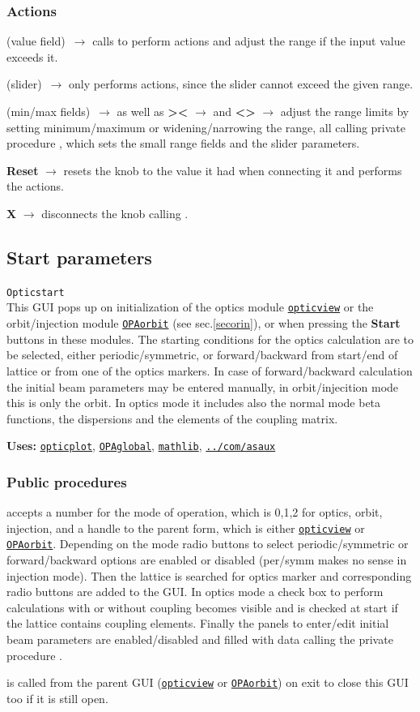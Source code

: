 \documentclass[12pt]{article}
\newcommand\code[1]{{\tt #1}}
\newcommand{\ofld}[1]{\colorbox{black!15}{{\bf #1}}}
\newcommand{\ofldx}[1]{\colorbox{black!15}{(#1)}}
\newcommand\guico[1]{{\color{blue}\code{#1}}}
\newcommand\guifco[1]{{\color{violet}\code{#1}}}
\newcommand{\evcodf}[2]{\ofld{#1} $\rightarrow$ \guifco{#2}}
\newcommand{\evcodxf}[2]{\ofldx{#1}~$\rightarrow$ \guifco{#2}}
\newcommand{\opagui}[1]{\colorbox{blue!20}{\code{#1}}}
\newcommand{\oguih}[2]{\subsection{\label{#2}#1}{\Huge\opagui{#2}}\\}
\newcommand{\ogui}[1]{\hyperref[#1]{\opagui{#1}}}
\newcommand{\opauni}[1]{\colorbox{orange!30}{\code{#1}}}
\newcommand{\ouni}[1]{\hyperref[#1]{\opauni{#1}}}
\newcommand{\uses}[1]{{\bf Uses: } #1}
\newcommand{\desc}[1]{#1}
\newcommand{\act}[1]{\subsubsection*{Actions} #1}
\newcommand{\ppro}[1]{\subsubsection*{Public procedures} #1}
\begin{document}
\act{
\evcodxf{value field}{editKKeyPress} calls \guifco{KUpdate} to perform actions and adjust the range if the input value exceeds it.

\evcodxf{slider}{sliderScroll} only performs actions, since the slider cannot exceed the given range.

\evcodxf{min/max fields}{editmin/maxKeyPress} as well as \evcodf{\textgreater\textless}{butwidClick} and \evcodf{\textless\textgreater}{butnarClick} adjust the range limits by setting minimum/maximum or widening/narrowing the range, all calling private procedure \guifco{SetKrange}, which sets the small range fields and the slider parameters.

\evcodf{Reset}{butresClick} resets the knob to the value it had when connecting it and performs the actions.

\evcodf{X}{butfreeClick} disconnects the knob calling \guifco{Unload}.
}

\oguih{Start parameters}{Opticstart} 

\desc{This GUI pops up on initialization of the optics module  \ogui{opticview} or the orbit/injection module \ogui{OPAorbit} (see sec.\ref{secorin}), or when pressing the \ofld{Start} buttons in these modules. The starting conditions for the optics calculation are to be selected, either periodic/symmetric, or forward/backward from start/end of lattice or from one of the optics markers. In case of forward/backward calculation the initial beam parameters may be entered manually, in orbit/injecition mode this is only the orbit. In optics mode it includes also the normal mode beta functions, the dispersions and the elements of the coupling matrix.}

\uses{\ouni{opticplot}, \ouni{OPAglobal}, \ouni{mathlib}, \ouni{../com/asaux}} 

\ppro{
\guico{Load} accepts a number for the mode of operation, which is 0,1,2 for optics, orbit, injection, and a handle to the parent form, which is either \ogui{opticview} or \ogui{OPAorbit}. Depending on the mode radio buttons to select periodic/symmetric or forward/backward options are enabled or disabled (per/symm makes no sense in injection mode). Then the lattice is searched for optics marker and corresponding radio buttons are added to the GUI. In optics mode a check box to perform calculations with or without coupling becomes visible and is checked at start if the lattice contains coupling elements. Finally the panels to enter/edit initial beam parameters are enabled/disabled and filled with data calling the private procedure \guico{set\_pan\_ini}.

\guico{Exit} is called from the parent GUI (\ogui{opticview} or \ogui{OPAorbit}) on exit to close this GUI too if it is still open.
}
\end{document}
